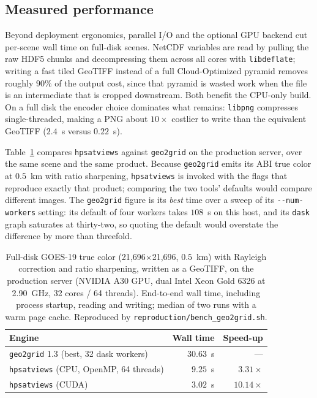 \documentclass[preprint,12pt]{elsarticle}
\newcommand{\PRODSERVER}{the production server (NVIDIA A30 GPU, dual Intel Xeon
Gold 6326 at 2.90~GHz, 32 cores / 64 threads)}
\begin{document}
\subsection{Measured performance}
\label{sec:performance}

Beyond deployment ergonomics, parallel I/O and the optional GPU backend cut
per-scene wall time on full-disk scenes. NetCDF variables are read by pulling
the raw HDF5 chunks and decompressing them across all cores with
\texttt{libdeflate}; writing a fast tiled GeoTIFF instead of a full
Cloud-Optimized pyramid removes roughly $90\%$ of the output cost, since that
pyramid is wasted work when the file is an intermediate that is cropped
downstream. Both benefit the CPU-only build. On a full disk the encoder choice
dominates what remains: \texttt{libpng} compresses single-threaded, making a PNG
about $10\times$ costlier to write than the equivalent GeoTIFF ($2.4$~s versus
$0.22$~s).

Table~\ref{tab:perf} compares \texttt{hpsatviews} against \texttt{geo2grid}
on the production server, over the same scene and the same product. Because
\texttt{geo2grid} emits its ABI true color at $0.5$~km with ratio sharpening,
\texttt{hpsatviews} is invoked with the flags that reproduce exactly that
product; comparing the two tools' defaults would compare different images. The
\texttt{geo2grid} figure is its \emph{best} time over a sweep of its
\texttt{-{}-num-workers} setting: its default of four workers takes $108$~s on
this host, and its \texttt{dask} graph saturates at thirty-two, so quoting the
default would overstate the difference by more than threefold.

\begin{table}[!ht]
\centering
\caption{Full-disk GOES-19 true color (21{,}696$\times$21{,}696, $0.5$~km) with
Rayleigh correction and ratio sharpening, written as a GeoTIFF, on \PRODSERVER.
End-to-end wall time, including process startup, reading and writing; median of
two runs with a warm page cache. Reproduced by
\texttt{reproduction/bench\_geo2grid.sh}.}
\label{tab:perf}
\begin{tabular}{@{}lrr@{}}
\toprule
\textbf{Engine} & \textbf{Wall time} & \textbf{Speed-up} \\
\midrule
\texttt{geo2grid} 1.3 (best, 32 dask workers) & $30.63$~s & --- \\
\texttt{hpsatviews} (CPU, OpenMP, 64 threads) & $9.25$~s & $3.31\times$ \\
\texttt{hpsatviews} (CUDA) & $3.02$~s & $10.14\times$ \\
\bottomrule
\end{tabular}
\end{table}
\end{document}
